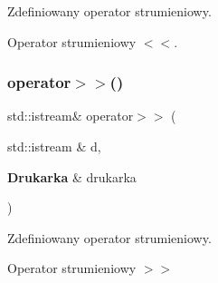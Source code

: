 Zdefiniowany operator strumieniowy. 

Operator strumieniowy $<$$<$. \mbox{\label{_drukarka_8cpp_a690d14a94727eaaeb482b4fa3356c761}} 
\subsubsection{operator$>$$>$()}
{\footnotesize\ttfamily std\+::istream\& operator$>$$>$ (\begin{DoxyParamCaption}\item[{std\+::istream \&}]{d,  }\item[{\textbf{ Drukarka} \&}]{drukarka }\end{DoxyParamCaption})}



Zdefiniowany operator strumieniowy. 

Operator strumieniowy $>$$>$ 